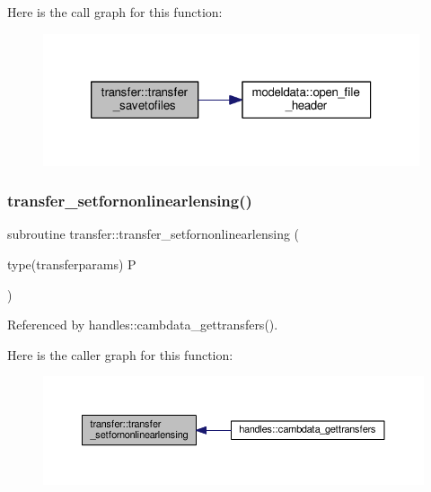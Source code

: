 Here is the call graph for this function\+:
\nopagebreak
\begin{figure}[H]
\begin{center}
\leavevmode
\includegraphics[width=314pt]{namespacetransfer_adc67bad9d6015b3ecd203551b927d522_cgraph}
\end{center}
\end{figure}
\mbox{\label{namespacetransfer_ad877dbf164ab7d108432f41d21c155fd}} 
\subsubsection{\texorpdfstring{transfer\+\_\+setfornonlinearlensing()}{transfer\_setfornonlinearlensing()}}
{\footnotesize\ttfamily subroutine transfer\+::transfer\+\_\+setfornonlinearlensing (\begin{DoxyParamCaption}\item[{type(transferparams)}]{P }\end{DoxyParamCaption})}



Referenced by handles\+::cambdata\+\_\+gettransfers().

Here is the caller graph for this function\+:
\nopagebreak
\begin{figure}[H]
\begin{center}
\leavevmode
\includegraphics[width=350pt]{namespacetransfer_ad877dbf164ab7d108432f41d21c155fd_icgraph}
\end{center}
\end{figure}
\mbox{\label{namespacetransfer_a138e96e5b60355e8136607e26339b2a0}} 
